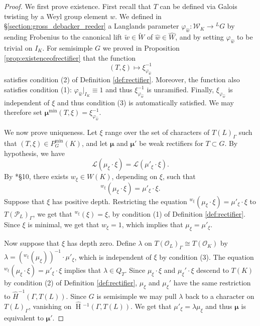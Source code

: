 \documentclass{compositio}
\theoremstyle{plain}
\newcommand{\HT}[1]{\hat{\HH}{}^{#1}}
\theoremstyle{definition}
\numberwithin{equation}{section}
\DeclareMathOperator{\HH}{H}
\newcommand{\OK}{\mathcal{O}_K}
\newcommand{\PL}{\mathcal{P}_L}
\newcommand{\OL}{\mathcal{O}_L}
\newcommand{\Weil}{\mathcal{W}}
\newcommand{\Lpack}{\mathcal{L}}
\newcommand{\Pmin}{P_G^{\min}}
\newcommand{\bmu}{\boldsymbol\mu}
\newcommand{\mumin}{\bmu^{\min}}
\begin{document}
\begin{proof}
We first prove existence.
First recall that $T$ can be defined
via Galois twisting by a Weyl group element $w$.  We defined in
\S\ref{section:gross_debacker_reeder}
a Langlands parameter $\varphi_{\hat{w}} :\Weil _K \rightarrow {}^L G$ by
sending Frobenius to the canonical lift
$\tilde{w} \in \widetilde{W}$ of $\hat{w} \in \hat{W}$, and by setting
$\varphi_{\hat{w}}$ to be trivial on $I_K$.
For semisimple $G$
we proved in Proposition \ref{prop:existenceofrectifier}
that the function $$(T, \xi) \mapsto \xi_{\varphi_{\hat{w}}}^{-1}$$
satisfies condition (2) of Definition \ref{def:rectifier}.  Moreover, the function also
satisfies condition (1): $\varphi_{\hat{w}}|_{I_K} \equiv 1$ and thus
$\xi_{\varphi_{\hat{w}}}^{-1}$ is unramified.
Finally, $\xi_{\varphi_{\hat{w}}}$ is independent of $\xi$
and thus condition (3) is automatically satisfied.
We may therefore set
$\mumin(T,\xi) = \xi_{\varphi_{\hat{w}}}^{-1}$.

We now prove uniqueness.
Let $\xi$ range over the set of characters of $T(L)_{\Gamma}$
such that $(T, \xi) \in \Pmin(K)$, and let
$\bmu$ and $\bmu'$ be weak rectifiers for
$T \subset G$.  By hypothesis, we have
$$\Lpack(\mu_{\xi} \cdot \xi) = \Lpack(\mu'_{\xi} \cdot \xi).$$
By \cite{murnaghan:11}*{\S10}, there exists $w_{\xi} \in W(K)$,
depending on $\xi$, such that
$${}^{w_{\xi}} (\mu_\xi \cdot \xi) = \mu'_\xi \cdot \xi.$$
Suppose that $\xi$ has positive depth.
Restricting the equation
${}^{w_\xi} (\mu_\xi \cdot \xi) = \mu'_\xi \cdot \xi$
to $T(\PL)_{\Gamma}$, we get that ${}^{w_{\xi}} (\xi) = \xi$,
by condition (1) of Definition \ref{def:rectifier}.
Since $\xi$ is minimal, we get that $w_{\xi} = 1$, which implies
that $\mu_{\xi} = \mu'_{\xi}$.

Now suppose that $\xi$ has depth zero.
Define $\lambda$ on $T(\OL)_{\Gamma} \cong T(\OK)$ by $\lambda = ({}^{w_\xi} (\mu_\xi))^{-1} \cdot \mu'_\xi$,
which is independent of $\xi$ by condition (3). The equation ${}^{w_\xi} (\mu_\xi \cdot \xi) = \mu'_\xi \cdot \xi$
implies that $\lambda \in Q_T$.  Since $\mu_\xi \cdot \xi$ and $\mu_\xi' \cdot \xi$ descend to
$T(K)$ by condition (2) of Definition \ref{def:rectifier}, $\mu_\xi$ and $\mu_\xi'$ have the
same restriction to $\hat{H}^{-1}(\Gamma, T(L))$.  Since $G$ is semisimple we may pull $\lambda$ back to
a character on $T(L)_\Gamma$, vanishing on $\HT{-1}(\Gamma, T(L))$.  We get that $\mu'_\xi = \lambda\mu_\xi$
and thus $\bmu$ is equivalent to $\bmu'$.
\end{proof}
\end{document}
